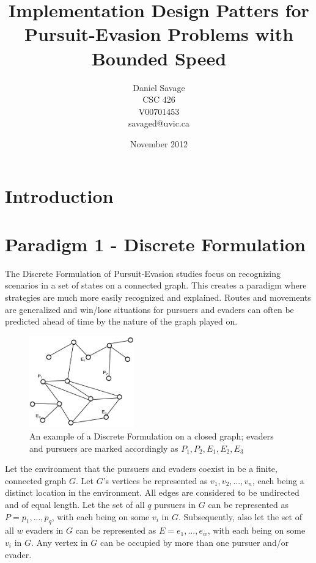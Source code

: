 \documentclass{article}
\begin{document}
\title{Implementation Design Patters for Pursuit-Evasion Problems with Bounded Speed}
\author{Daniel Savage\\CSC 426\\{V00701453}\\savaged@uvic.ca}
\date{November 2012}
\maketitle
\pagebreak

\section{Introduction}

\section{Paradigm 1 - Discrete Formulation}
The Discrete Formulation of Pursuit-Evasion studies focus on recognizing scenarios in a set of states on a connected graph. This creates a paradigm where strategies are much more easily recognized and explained. Routes and movements are generalized and win/lose situations for pursuers and evaders can often be predicted ahead of time by the nature of the graph played on.

\begin{figure}[htb]
\centering
\includegraphics[width=0.4\textwidth]{"graph1"}
\caption{An example of a Discrete Formulation on a closed graph; evaders and pursuers are marked accordingly as \(P_1,P_2,E_1,E_2,E_3\)}
\end{figure}

Let the environment that the pursuers and evaders coexist in be a finite, connected graph \(G\). Let \(G\)'s vertices be represented as \(v_1,v_2,...,v_n\), each being a distinct location in the environment. All edges are considered to be undirected and of equal length. Let the set of all \(q\) pursuers in \(G\) can be represented as \(P = {p_1,...,p_q}\), with each being on some \(v_i\) in \(G\). Subsequently, also let the set of all \(w\) evaders in \(G\) can be represented as \(E = {e_1,...,e_w}\), with each being on some \(v_i\) in \(G\). Any vertex in \(G\) can be occupied by more than one pursuer and/or evader.
\end{document}
